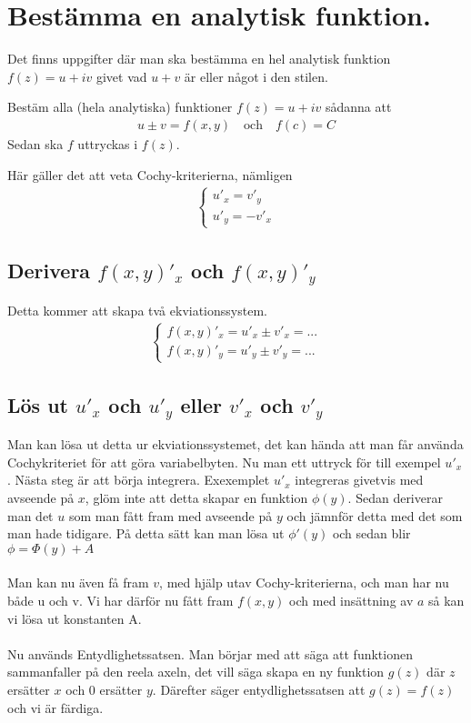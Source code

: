 \section{Bestämma en analytisk funktion.}
Det finns uppgifter där man ska bestämma en hel analytisk funktion $f(z) = u +iv$ givet vad $u+v$ är eller något i den stilen.
\begin{tcolorbox}
	Bestäm alla (hela analytiska) funktioner $f(z) =u+iv$ sådanna att 
\begin{align*}
	u \pm v = f(x,y) \quad \text{och} \quad f(c) = C
\end{align*}
	Sedan ska $f$ uttryckas i $f(z)$.
\end{tcolorbox}
Här gäller det att veta Cochy-kriterierna, nämligen 
\begin{align*}
	\begin{cases}
		u'_x = v'_y \\
		u'_y = -v'_x
	\end{cases}
\end{align*}

\subsection{Derivera $f(x,y)'_x$ och $f(x,y)'_y$}
Detta kommer att skapa två ekviationssystem. 
\begin{align*}
	\begin{cases}
		f(x,y)'_x = u'_x \pm v'_x  = ... \\
		f(x,y)'_y = u'_y \pm v'_y = ...
	\end{cases}
\end{align*}

\subsection{Lös ut $u'_x$ och $u'_y$ eller $v'_x$ och $v'_y$}
Man kan lösa ut detta ur ekviationssystemet, det kan hända att man får använda Cochykriteriet för att göra variabelbyten. Nu man ett uttryck för till exempel $u'_x$. Nästa steg är att börja integrera. Exexemplet $u'_x$ integreras givetvis med avseende på $x$, glöm inte att detta skapar en funktion $\phi(y)$. Sedan deriverar man det $u$ som man fått fram med avseende på $y$ och jämnför detta med det som man hade tidigare. På detta sätt kan man lösa ut $\phi'(y)$ och sedan blir $\phi = \Phi(y) + A$ \\ \\

Man kan nu även få fram $v$, med hjälp utav Cochy-kriterierna, och man har nu både u och v. Vi har därför nu fått fram $f(x,y)$ och med insättning av $a$ så kan vi lösa ut konstanten A. \\ \\

Nu används Entydlighetssatsen. Man börjar med att säga att funktionen sammanfaller på den reela axeln, det vill säga skapa en ny funktion $g(z)$ där $z$ ersätter $x$ och $0$ ersätter $y$. Därefter säger entydlighetssatsen att $g(z) = f(z)$ och vi är färdiga.    
